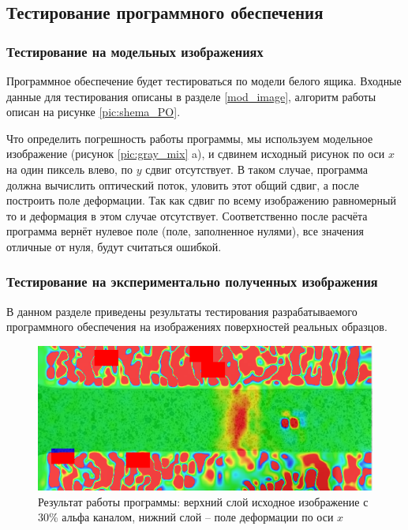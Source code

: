 

\subsection{Тестирование программного обеспечения}
\subsubsection{Тестирование на модельных изображениях}

Программное обеспечение будет тестироваться по модели белого ящика. Входные данные для тестирования описаны в разделе \ref{mod_image}, алгоритм работы описан на рисунке \ref{pic:shema_PO}.
 
Что определить погрешность работы программы, мы используем модельное изображение (рисунок \ref{pic:gray_mix} a), и сдвинем исходный рисунок по оси $x$ на один пиксель влево, по $y$ сдвиг отсутствует.
В таком случае, программа должна вычислить оптический поток, уловить этот общий сдвиг, а после построить поле деформации. Так как сдвиг по всему изображению равномерный то и деформация в этом случае отсутствует. Соответственно после расчёта программа вернёт нулевое поле (поле, заполненное нулями), все значения отличные от нуля, будут считаться ошибкой.

\subsubsection{Тестирование на экспериментально полученных изображения}
В данном разделе приведены результаты тестирования разрабатываемого программного обеспечения на изображениях поверхностей реальных образцов.

\begin{figure}
\centering
\includegraphics[width=0.7\linewidth]{images/al_strain}
\caption{Результат работы программы: верхний слой исходное изображение с 30\% альфа каналом, нижний слой -- поле деформации по оси $x$}
\label{fig:al_strain}
\end{figure}

